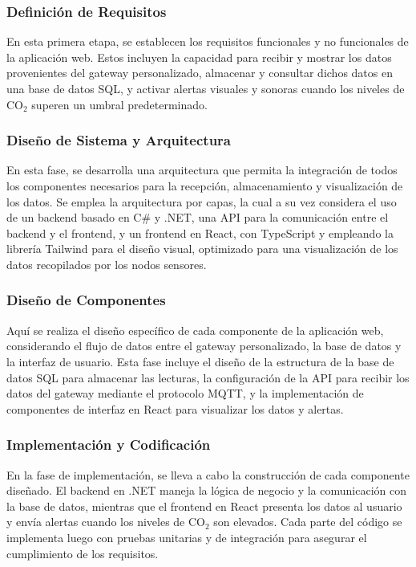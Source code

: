 \subsubsection{Definición de Requisitos}

En esta primera etapa, se establecen los requisitos funcionales y no funcionales de la aplicación web. Estos incluyen la capacidad para recibir y mostrar los datos provenientes del gateway personalizado, almacenar y consultar dichos datos en una base de datos SQL, y activar alertas visuales y sonoras cuando los niveles de CO\(_2\) superen un umbral predeterminado.

\subsubsection{Diseño de Sistema y Arquitectura}

En esta fase, se desarrolla una arquitectura que permita la integración de todos los componentes necesarios para la recepción, almacenamiento y visualización de los datos. Se emplea la arquitectura por capas, la cual a su vez considera el uso de un backend basado en C\# y .NET, una API para la comunicación entre el backend y el frontend, y un frontend en React, con TypeScript y empleando la librería Tailwind para el diseño visual, optimizado para una visualización de los datos recopilados por los nodos sensores.

\subsubsection{Diseño de Componentes}

Aquí se realiza el diseño específico de cada componente de la aplicación web, considerando el flujo de datos entre el gateway personalizado, la base de datos y la interfaz de usuario. Esta fase incluye el diseño de la estructura de la base de datos SQL para almacenar las lecturas, la configuración de la API para recibir los datos del gateway mediante el protocolo MQTT, y la implementación de componentes de interfaz en React para visualizar los datos y alertas.

\subsubsection{Implementación y Codificación}

En la fase de implementación, se lleva a cabo la construcción de cada componente diseñado. El backend en .NET maneja la lógica de negocio y la comunicación con la base de datos, mientras que el frontend en React presenta los datos al usuario y envía alertas cuando los niveles de CO\(_2\) son elevados. Cada parte del código se implementa luego con pruebas unitarias y de integración para asegurar el cumplimiento de los requisitos.

